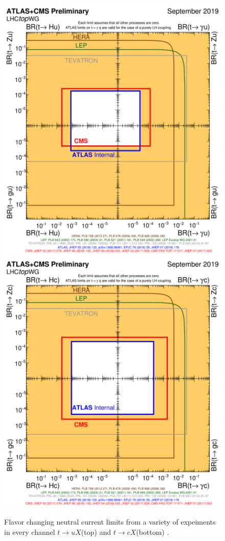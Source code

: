 \begin{figure}[h!]
	\centering
	\includegraphics[width=.5\columnwidth]{../ThesisImages/Theory/fcnc_tXu_sep18.png}
	\includegraphics[width=.5\columnwidth]{../ThesisImages/Theory/fcnc_tXc_sep18.png}
	\caption[Flavor changing neutral current limits from a variety of expeiments in every channel $t\rightarrow uX$(top) and $t\rightarrow cX$(bottom).]{Flavor changing neutral current limits from a variety of expeiments in every channel $t\rightarrow uX$(top) and $t\rightarrow cX$(bottom) \cite{TopWG}.}
	\label{fig:FCNCLimsBox}
\end{figure}

